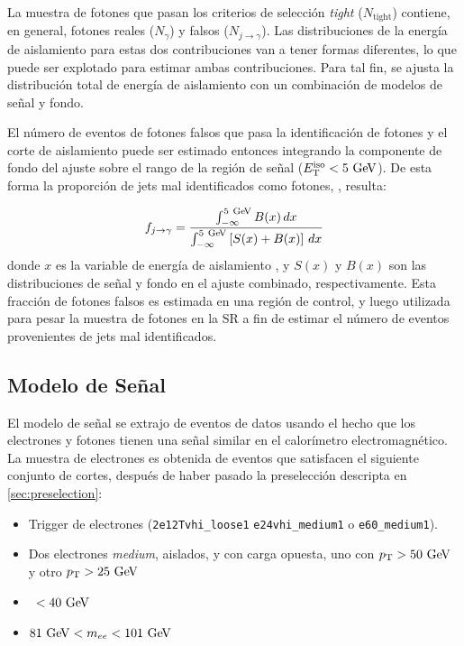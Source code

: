 La muestra de fotones que pasan los criterios de selección \emph{tight}
($N_\text{tight}$) contiene, en general, fotones reales ($N_{\gamma}$) y falsos
($N_{j\to\gamma}$). Las distribuciones de la energía de aislamiento para estas
dos contribuciones van a tener formas diferentes, lo que puede ser explotado
para estimar ambas contribuciones. Para tal fin, se ajusta la distribución
total de energía de aislamiento con un combinación de modelos de señal y fondo.


El número de eventos de fotones falsos que pasa la identificación de fotones y
el corte de aislamiento puede ser estimado entonces integrando la componente de
fondo del ajuste sobre el rango de la región de señal ($\etiso<5\GeV$). De esta
forma la proporción de jets mal identificados como fotones, \fjg, resulta:

\begin{equation}\label{eq:jfake_formula}
  f_{j\to \gamma} = \frac{\int_{-\infty}^{5\gev} B(x)\, dx}{\int_{-\infty}^{5\gev} \left[S(x)+B(x)\right]\, dx}
\end{equation}
%
donde $x$ es la variable de energía de aislamiento \etiso, y $S(x)$ y $B(x)$
son las distribuciones de señal y fondo en el ajuste combinado, respectivamente.
Esta fracción de fotones falsos es estimada en una región de control, y luego
utilizada para pesar la muestra de fotones en la SR a fin de estimar el número de
eventos provenientes de jets mal identificados. %



\subsection{Modelo de Señal} \label{sec:jfake_sig_template}

El modelo de señal se extrajo de eventos de datos {\Zee} usando el hecho que los
electrones y fotones tienen una señal similar en el calorímetro
electromagnético. La muestra de electrones es obtenida de eventos que satisfacen
el siguiente conjunto de cortes, después de haber pasado la preselección
descripta en \cref{sec:preselection}:

\begin{itemize}\itemsep0.1cm
\item Trigger de electrones (\texttt{2e12Tvhi\_loose1} \texttt{e24vhi\_medium1} o
  \texttt{e60\_medium1}).
\item Dos electrones \emph{medium}, aislados, y con carga opuesta, uno con $\pt>50\gev$
  y otro $\pt>25 \gev$
\item \MET\ $<40\gev$
\item $81\gev<m_{ee}<101\gev$
\end{itemize}

